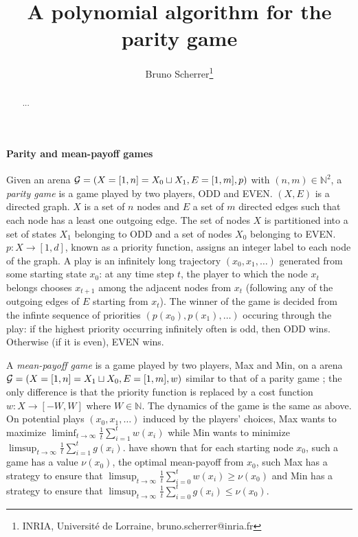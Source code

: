 \documentclass{article}
\title{A polynomial algorithm for the parity game}
\author{Bruno Scherrer\footnote{INRIA, Universit\'e de Lorraine, bruno.scherrer@inria.fr}}
\def\N{\mathbb N}
\def\G{{\cal G}}
\begin{document}
\maketitle

\begin{abstract}
  ...
\end{abstract}


\paragraph{Parity and mean-payoff games}

Given an arena $\G=(X=[1,n]=X_0 \sqcup X_1,E=[1,m],p)$ with $(n,m) \in \N^2$, a \emph{parity game} is a game played by two players, ODD and EVEN.
$(X,E)$ is a directed graph. $X$ is a set of $n$ nodes and $E$ a set of $m$ directed edges such that each node has a least one outgoing edge. 
The set of nodes  $X$ is partitioned into a set of states $X_1$ belonging to ODD and a set of nodes $X_0$ belonging to EVEN. $p:X \to [1,d]$, known as a priority function, assigns an integer label to each node of the graph.
A play is an infinitely long trajectory $(x_0,x_1,\dots)$ generated from some starting state $x_0$: at any time step $t$, the player to which the node $x_t$ belongs chooses $x_{t+1}$ among the adjacent nodes from $x_t$ (following any of the outgoing edges of $E$ starting from $x_t$). The winner of the game is decided from the infinte sequence of priorities $(p(x_0),p(x_1),\dots)$ occuring through the play: if the highest priority occurring infinitely often is odd, then ODD wins. Otherwise (if it is even), EVEN wins. 

A \emph{mean-payoff game} is a game played by two players, Max and Min, on a arena $\G=(X=[1,n]=X_1 \sqcup X_0, E=[1,m],w)$ similar to that of a parity game ; the only difference is that the priority function is replaced by a cost function $w:X \to [-W,W]$ where $W \in \N$. The dynamics of the game is the same as above. On potential plays $(x_0,x_1,\dots)$ induced by the players' choices, Max wants to maximize $\liminf_{t \to \infty}\frac{1}{t} \sum_{i=1}^t w(x_i)$ while Min wants to minimize $\limsup_{t \to \infty}\frac{1}{t} \sum_{i=1}^t g(x_i)$. \citet{ehrenfeucht79} have shown that for each starting node $x_0$,  such a game has a value $\nu(x_0)$, the optimal mean-payoff from $x_0$, such Max has a strategy to ensure that $\limsup_{t \to \infty}\frac{1}{t} \sum_{i=0}^t w(x_i) \ge \nu(x_0)$ and Min has a strategy to ensure that $\limsup_{t \to \infty}\frac{1}{t} \sum_{i=0}^t g(x_i) \le \nu(x_0)$.
\end{document}
